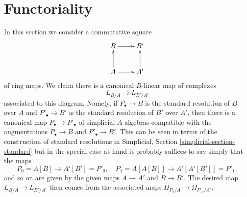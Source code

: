 \documentclass{stacks-project}
\theoremstyle{plain}
\theoremstyle{definition}
\theoremstyle{remark}
\numberwithin{equation}{subsection}
\begin{document}
\section{Functoriality}
\label{section-functoriality}

\noindent
In this section we consider a commutative square
\begin{equation}
\label{equation-commutative-square}
\vcenter{
\xymatrix{
B \ar[r] & B' \\
A \ar[u] \ar[r] & A' \ar[u]
}
}
\end{equation}
of ring maps. We claim there is a canonical $B$-linear map of complexes
$$
L_{B/A} \longrightarrow L_{B'/A'}
$$
associated to this diagram. Namely, if $P_\bullet \to B$ is the
standard resolution of $B$ over $A$ and $P'_\bullet \to B'$ is the
standard resolution of $B'$ over $A'$, then there is a canonical map
$P_\bullet \to P'_\bullet$
of simplicial $A$-algebras compatible with the augmentations
$P_\bullet \to B$ and $P'_\bullet \to B'$. This can be seen in terms
of the construction of standard resolutions in
Simplicial, Section \ref{simplicial-section-standard}
but in the special case at hand it probably suffices to say simply
that the maps
$$
P_0 = A[B] \longrightarrow A'[B'] = P'_0,\quad
P_1 = A[A[B]] \longrightarrow A'[A'[B']] = P'_1,
$$
and so on are given by the given maps $A \to A'$ and $B \to B'$.
The desired map $L_{B/A} \to L_{B'/A'}$ then comes from the associated
maps $\Omega_{P_n/A} \to \Omega_{P'_n/A'}$.
\end{document}
